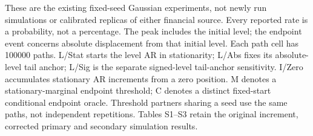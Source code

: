 \documentclass[10pt,a4paper]{article}
\begin{document}
These are the existing fixed-seed Gaussian experiments, not newly run
simulations or calibrated replicas of either financial source. Every reported
rate is a probability, not a percentage. The peak includes the initial level;
the endpoint event concerns absolute displacement from that initial level.
Each path cell has 100000 paths.
L/Stat starts the level AR in stationarity; L/Abs fixes its absolute-level
tail anchor; L/Sig is the separate signed-level tail-anchor sensitivity.
I/Zero accumulates stationary AR increments from a zero position.
M denotes a stationary-marginal endpoint threshold; C denotes a distinct
fixed-start conditional endpoint oracle. Threshold partners sharing a seed use
the same paths, not independent repetitions.
Tables S1--S3 retain the original increment, corrected primary and secondary simulation results.
\begingroup
\footnotesize
\setlength{\tabcolsep}{3pt}
\renewcommand{\arraystretch}{1.12}
\end{document}
